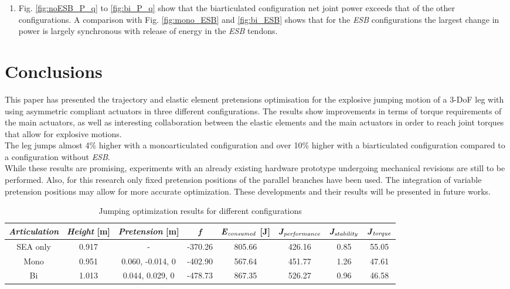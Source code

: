 \documentclass[letterpaper, 10 pt, conference]{ieeeconf}  %
\begin{document}
\begin{enumerate}
		\item Fig. \ref{fig:noESB_P_q} to \ref{fig:bi_P_q} show that the biarticulated configuration net joint power exceeds that of the other configurations. A comparison with Fig. \ref{fig:mono_ESB} and \ref{fig:bi_ESB} shows that for the \textit{ESB} configurations the largest change in power is largely synchronous with release of energy in the \textit{ESB} tendons.
	\end{enumerate}
	
	\section{Conclusions} \label{sec:conclusions} 
	
	This paper has presented the trajectory and elastic element pretensions optimisation for the explosive jumping motion of a 3-DoF leg with using asymmetric compliant actuators in three different configurations. The results show improvements in terms of torque requirements of the main actuators, as well as interesting collaboration between the elastic elements and the main actuators in order to reach joint torques that allow for explosive motions.\\
	The leg jumps almost 4\% higher with a monoarticulated configuration and over 10\% higher with a biarticulated configuration compared to a configuration without \textit{ESB}.\\
	While these results are promising, experiments with an already existing hardware prototype undergoing mechanical revisions are still to be performed. Also, for this research only fixed pretension positions of the parallel branches have been used. The integration of variable pretension positions may allow for more accurate optimization. These developments and their results will be presented in future works.
	
	\begin{table}[ht]
		\caption{Jumping optimization results for different configurations}
		\label{maxheight}
		\begin{center}
			\begin{tabular}[t]{c||c|c|c|c|c|c|c}
				\textit{Articulation}	& \textit{Height} [m] & \textit{Pretension} [m] & \textit{f} & \textit{E}$_{\text{\textit{consumed}}}$ [J] & \textit{J}$_{\text{\textit{performance}}}$ & \textit{J}$_{\text{\textit{stability}}}$ & \textit{J}$_{\text{\textit{torque}}}$\\ 
				\hline
				SEA only& 0.917 & - &-370.26  & 805.66 & 426.16  &0.85  &   55.05\\
				\hline
				Mono &0.951 & 0.060, -0.014, 0  & -402.90 & 567.64& 451.77 & 1.26 &47.61 \\
				\hline
				Bi &1.013 & 0.044, 0.029, 0 & -478.73 & 867.35 & 526.27 & 0.96 & 46.58
			\end{tabular}
		\end{center}
	\end{table}
	
\end{document}
